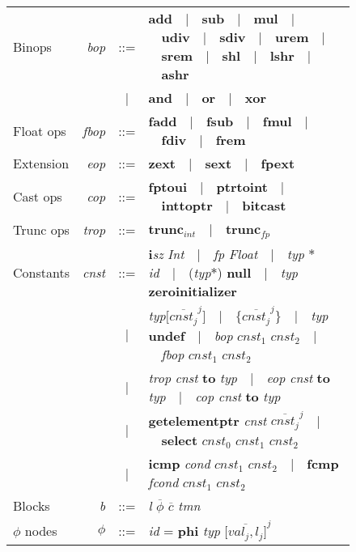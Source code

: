 \documentclass[a4paper]{book}
\begin{document}
\begin{figure}[hb]
\begin{tabular}{ l r c l }
Binops & \textit{bop} & ::= & \textbf{add}~~|~~\textbf{sub}~~|~~\textbf{mul}~~|~~\textbf{udiv}~~|~~\textbf{sdiv}~~|~~\textbf{urem}~~|~~\textbf{srem}~~|~~\textbf{shl}~~|~~\textbf{lshr}~~|~~\textbf{ashr} \\
& & | & \textbf{and}~~|~~\textbf{or}~~|~~\textbf{xor} \\

Float ops & \textit{fbop} & ::= & \textbf{fadd}~~|~~\textbf{fsub}~~|~~\textbf{fmul}~~|~~\textbf{fdiv}~~|~~\textbf{frem} \\

Extension & \textit{eop} & ::= & \textbf{zext}~~|~~\textbf{sext}~~|~~\textbf{fpext} \\

Cast ops & \textit{cop} & ::= & \textbf{fptoui}~~|~~\textbf{ptrtoint}~~|~~\textbf{inttoptr}~~|~~\textbf{bitcast} \\

Trunc ops & \textit{trop} & ::= & $\textbf{trunc}_{\textit{int}}$~~|~~$\textbf{trunc}_{\textit{fp}}$ \\

Constants & \textit{cnst} & ::= & \textbf{i}\textit{sz} \textit{Int}~~|~~\textit{fp Float}~~|~~\textit{typ} $*$ \textit{id}~~|~~(\textit{typ}$*$) \textbf{null}~~|~~\textit{typ} \textbf{zeroinitializer} \\
& & | & \textit{typ}$\big[\overline{\textit{cnst}_j}^j\big]$~~|~~$\big\{\overline{\textit{cnst}_j}^j\big\}$~~|~~\textit{typ} \textbf{undef}~~|~~\textit{bop} $\textit{cnst}_1$ $\textit{cnst}_2$~~|~~\textit{fbop} $\textit{cnst}_1$ $\textit{cnst}_2$ \\
& & | & \textit{trop} \textit{cnst} \textbf{to} \textit{typ}~~|~~\textit{eop cnst} \textbf{to} \textit{typ}~~|~~\textit{cop cnst} \textbf{to} \textit{typ} \\
& & | & \textbf{getelementptr} \textit{cnst} $\overline{\textit{cnst}_j}^j$~~|~~\textbf{select} $\textit{cnst}_0$ $\textit{cnst}_1$ $\textit{cnst}_2$ \\
& & | & \textbf{icmp} \textit{cond} $\textit{cnst}_1$ $\textit{cnst}_2$~~|~~\textbf{fcmp} \textit{fcond} $\textit{cnst}_1$ $\textit{cnst}_2$ \\

Blocks & \textit{b} & ::= & \textit{l} $\overline{\mathit{\phi}}$ $\overline{\textit{c}}$ \textit{tmn} \\

$\phi$ nodes & $\mathit{\phi}$ & ::= & \textit{id} = \textbf{phi} \textit{typ} $\overline{\big[\textit{val}_j, \textit{l}_j\big]}^j$ \\


\end{tabular}
\end{figure}
\end{document}
